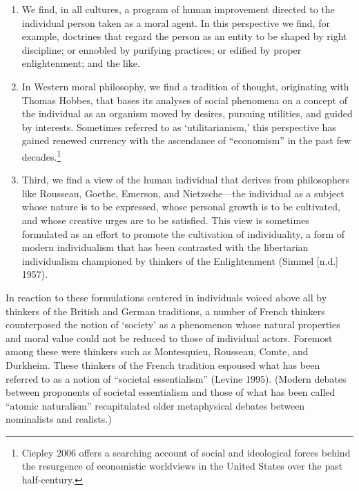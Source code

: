 \begin{enumerate}
\item We find, in all cultures, a program of human improvement directed to the individual person taken as a moral agent. In this perspective we find, for example, doctrines that regard the person as an entity to be shaped by right discipline; or ennobled by purifying practices; or edified by proper enlightenment; and the like. 
\item In Western moral philosophy, we find a tradition of thought, originating with Thomas Hobbes, that bases its analyses of social phenomena on a concept of the individual as an organism moved by desires, pursuing utilities, and guided by interests. Sometimes referred to as `utilitarianism,' this perspective has gained renewed currency with the ascendance of ``economism'' in the past few decades.\footnote{Ciepley 2006 offers a searching account of social and ideological forces behind the resurgence of economistic worldviews in the United States over the past half-century.}
\item Third, we find a view of the human individual that derives from philosophers like Rousseau, Goethe, Emerson, and Nietzsche---the individual as a subject whose nature is to be expressed, whose personal growth is to be cultivated, and whose creative urges are to be satisfied. This view is sometimes formulated as an effort to promote the cultivation of individuality, a form of modern individualism that has been contrasted with the libertarian individualism championed by thinkers of the Enlightenment (Simmel [n.d.] 1957).
\end{enumerate}

In reaction to these formulations centered in individuals voiced above all by thinkers of the British and German traditions, a number of French thinkers counterposed the notion of `society' as a phenomenon whose natural properties and moral value could not be reduced to those of individual actors. Foremost among these were thinkers such as Montesquieu, Rousseau, Comte, and Durkheim. These thinkers of the French tradition espoused what has been referred to as a notion of ``societal essentialism'' (Levine 1995). (Modern debates between proponents of societal essentialism and those of what has been called ``atomic naturalism'' recapitulated older metaphysical debates between nominalists and realists.)

